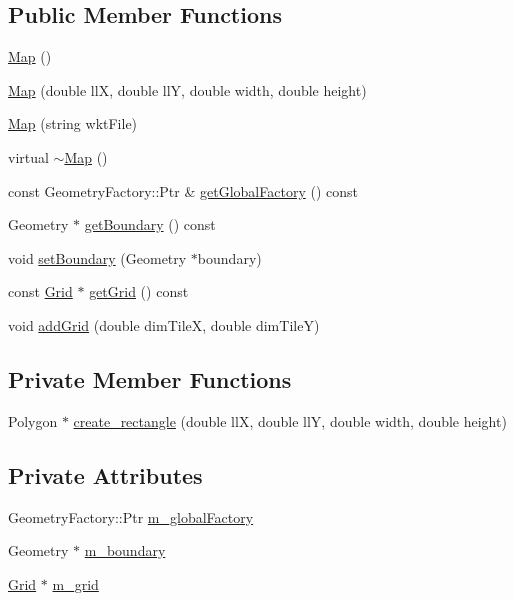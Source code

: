 \subsection*{Public Member Functions}
\begin{DoxyCompactItemize}
\item 
\mbox{\hyperlink{class_map_a0f5ad0fd4563497b4214038cbca8b582}{Map}} ()
\item 
\mbox{\hyperlink{class_map_a4c9545a0252613e2a6808932fe83f9ad}{Map}} (double llX, double llY, double width, double height)
\item 
\mbox{\hyperlink{class_map_ab8beab7a7dce782a23db740cd7132552}{Map}} (string wkt\+File)
\item 
virtual \mbox{\hyperlink{class_map_ac1ab46138aa61acd0a58b1fd21e0df37}{$\sim$\+Map}} ()
\item 
const Geometry\+Factory\+::\+Ptr \& \mbox{\hyperlink{class_map_a69bd639b05daa393b051c76f0dc4af7c}{get\+Global\+Factory}} () const
\item 
Geometry $\ast$ \mbox{\hyperlink{class_map_a74dd5445ed90bea2a9cc3240bc23f1bc}{get\+Boundary}} () const
\item 
void \mbox{\hyperlink{class_map_acede2ccba9bf0f987f3dde8c332bec17}{set\+Boundary}} (Geometry $\ast$boundary)
\item 
const \mbox{\hyperlink{class_grid}{Grid}} $\ast$ \mbox{\hyperlink{class_map_aa9bf1c29b844f3b7fbf7a3153c24fef0}{get\+Grid}} () const
\item 
void \mbox{\hyperlink{class_map_aa3dba78a0b52b304c39d1fa6bff71b00}{add\+Grid}} (double dim\+TileX, double dim\+TileY)
\end{DoxyCompactItemize}
\subsection*{Private Member Functions}
\begin{DoxyCompactItemize}
\item 
Polygon $\ast$ \mbox{\hyperlink{class_map_a36539152d451138361d82469218b4661}{create\+\_\+rectangle}} (double llX, double llY, double width, double height)
\end{DoxyCompactItemize}
\subsection*{Private Attributes}
\begin{DoxyCompactItemize}
\item 
Geometry\+Factory\+::\+Ptr \mbox{\hyperlink{class_map_ac5f30e6c144955a3638192495fd7d843}{m\+\_\+global\+Factory}}
\item 
Geometry $\ast$ \mbox{\hyperlink{class_map_af2c95561cb4ff3b9950240351cf4303c}{m\+\_\+boundary}}
\item 
\mbox{\hyperlink{class_grid}{Grid}} $\ast$ \mbox{\hyperlink{class_map_a0fc16621dbe307d36170c3a96b24b7d9}{m\+\_\+grid}}
\end{DoxyCompactItemize}


